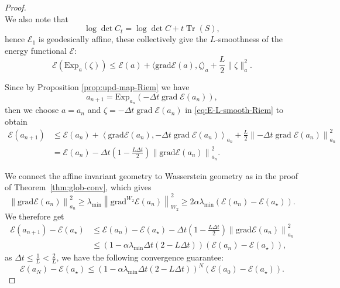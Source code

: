 \documentclass[11pt]{article}
\theoremstyle{plain}
\theoremstyle{definition}
\theoremstyle{remark}
\newcommand{\Tr}{\operatorname{Tr}}
\newcommand{\grad}{\operatorname{grad}}
\begin{document}
\begin{proof}
\begin{equation*}
    \end{equation*}
    We also note that
    \begin{equation*}
        \log \det C_t = \log \det C + t \Tr(S),
    \end{equation*}
    hence $\mathcal{E}_1$ is geodesically affine, these collectively give the $L$-smoothness of the energy functional $\mathcal{E}$:
    \begin{equation}\label{eq:E-L-smooth-Riem}
        \mathcal{E} (\mathrm{Exp}_a (\zeta)) \leq \mathcal{E} (a) + \langle \mathrm{grad} \mathcal{E} (a), \zeta \rangle_a + \frac{L}{2} \| \zeta \|_a^2.
    \end{equation}
    
    Since by Proposition \ref{prop:upd-map-Riem} we have
    \begin{equation*}
        a_{n+1} = \mathrm{Exp}_{a_n} \left( -\Delta t \grad \mathcal{E} (a_n) \right),
    \end{equation*}
    then we choose $a = a_n$ and $\zeta = -\Delta t \grad \mathcal{E} (a_n)$ in \eqref{eq:E-L-smooth-Riem} to obtain
    \begin{align*}
        \mathcal{E}(a_{n+1}) &\leq \mathcal{E} (a_n) + \left \langle \mathrm{grad} \mathcal{E} (a_n), -\Delta t \grad \mathcal{E} (a_n) \right \rangle_{a_n} +  \frac{L}{2} \left\|  -\Delta t \grad \mathcal{E} (a_n) \right\|_{a_n}^2 \\
        &= \mathcal{E} (a_n) - \Delta t \left( 1 - \frac{L\Delta t}{2} \right) \left\| \mathrm{grad} \mathcal{E} (a_n) \right\|_{a_n}^2.
    \end{align*}

    We connect the affine invariant geometry to Wasserstein geometry as in the proof of Theorem~\ref{thm:glob-conv}, which gives
    \begin{equation*}
        \left\| \mathrm{grad} \mathcal{E} (a_n) \right\|_{a_n}^2 \geq \lambda_{\min} \left\| \mathrm{grad}^{W_2} \mathcal{E} (a_n) \right\|_{W_2}^2 \geq 2 \alpha\lambda_{\min} (\mathcal{E} (a_n) - \mathcal{E} (a_\star)).
    \end{equation*}
    We therefore get
    \begin{align*}
        \mathcal{E}(a_{n+1}) - \mathcal{E} (a_\star) &\leq \mathcal{E} (a_n) - \mathcal{E} (a_\star) - \Delta t \left( 1 - \frac{L\Delta t}{2} \right) \left\| \mathrm{grad} \mathcal{E} (a_n) \right\|_{a_n}^2 \\
        &\leq (1 - \alpha \lambda_{\min} \Delta t (2 - L \Delta t)) (\mathcal{E} (a_n) - \mathcal{E} (a_\star)),
    \end{align*}
    as $\Delta t \leq \frac{1}{L} < \frac{2}{L}$, we have the following convergence guarantee:
    \begin{equation*}
        \mathcal{E}(a_{N}) - \mathcal{E} (a_\star) \leq (1 - \alpha \lambda_{\min} \Delta t (2 - L \Delta t))^N (\mathcal{E} (a_0) - \mathcal{E} (a_\star)).
    \end{equation*}
\end{proof}
\end{document}
